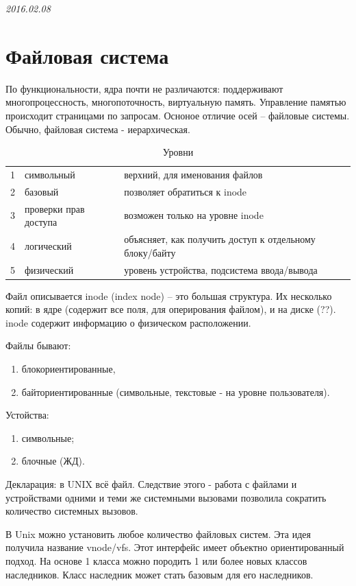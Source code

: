 \clearpage
\begin{flushright}
  \textit{2016.02.08}
\end{flushright}

\chapter{Файловая система}
По функциональности, ядра почти не различаются: поддерживают многопроцессность, многопоточность, виртуальную память. Управление памятью происходит страницами по запросам. Осноное отличие осей – файловые системы. Обычно, файловая система - иерархическая.

\begin{table}[H]
\caption{Уровни}
\begin{tabular}{|l|l|l|}
\hline
1 & символьный & верхний, для именования файлов\\
2 & базовый & позволяет обратиться к inode\\
3 & проверки прав доступа & возможен только на уровне inode\\
4 & логический & объясняет, как получить доступ к отдельному  блоку/байту\\
5 & физический & уровень устройства, подсистема ввода/вывода\\
\hline
\end{tabular}
\end{table}

Файл описывается inode (index node) – это большая структура. Их несколько копий: в ядре (содержит все поля, для оперирования файлом), и на диске (??). inode содержит информацию о физическом расположении.

Файлы бывают:
\begin{enumerate}
\item блокориентированные,
\item байториентированные (символьные, текстовые - на уровне пользователя).
\end{enumerate}

Устойства:
\begin{enumerate}
\item символьные;
\item блочные (ЖД).
\end{enumerate}

Декларация: в UNIX всё файл. Следствие этого - работа с файлами и устройствами одними и теми же системными вызовами позволила сократить количество системных вызовов.

В Unix можно установить любое количество файловых систем. Эта идея получила название vnode/vfs. Этот интерфейс имеет объектно ориентированный подход. На основе 1 класса можно породить 1 или более новых классов наследников. Класс наследник может стать базовым для его наследников.

